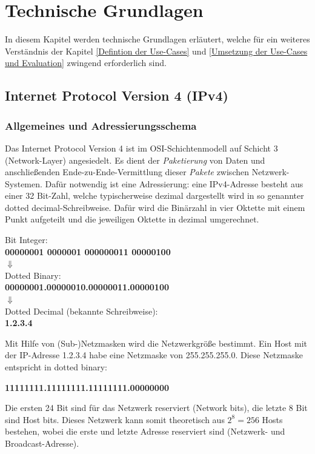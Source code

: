 \chapter{Technische Grundlagen} \label{Technische_Grundlagen}
In diesem Kapitel werden technische Grundlagen erläutert, welche für ein weiteres Verständnis der Kapitel \ref{Defintion der Use-Cases} und \ref{Umsetzung der Use-Cases und Evaluation} zwingend erforderlich sind.
\section{Internet Protocol Version 4 (IPv4)} \label{ipv4}
\subsection{Allgemeines und Adressierungsschema}
Das Internet Protocol Version 4 ist im \gls{OSI-Schichtenmodell} auf Schicht 3 (Network-Layer) angesiedelt\cite{itu1994}. Es dient der \textit{Paketierung} von Daten und anschließenden Ende-zu-Ende-Vermittlung dieser \textit{Pakete} zwischen Netzwerk-Systemen. Dafür notwendig ist eine Adressierung: eine IPv4-Adresse besteht aus einer 32 Bit-Zahl, welche typischerweise dezimal dargestellt wird in so genannter \glqq dotted decimal\grqq{}-Schreibweise. Dafür wird die Binärzahl in vier Oktette mit einem Punkt aufgeteilt und die jeweiligen Oktette in dezimal umgerechnet.

{ Bit Integer:\\
\textbf{00000001 0000001 000000011 00000100}\\
$\Downarrow$\\
\glqq Dotted Binary\grqq{}:\\
\textbf{00000001.00000010.00000011.00000100}\\
$\Downarrow$\\
Dotted Decimal (bekannte Schreibweise):\\
{\textbf{1.2.3.4}}\par}

Mit Hilfe von (Sub-)Netzmasken wird die Netzwerkgröße bestimmt. Ein Host mit der IP-Adresse 1.2.3.4 habe eine Netzmaske von 255.255.255.0. Diese Netzmaske entspricht in dotted binary:

{\centering\textbf{11111111.11111111.11111111.00000000}\par}

Die ersten 24 Bit sind für das Netzwerk reserviert (Network bits), die letzte 8 Bit sind Host bits. Dieses Netzwerk kann somit theoretisch aus $2^8 = 256$ Hosts bestehen, wobei die erste und letzte Adresse reserviert sind (Netzwerk- und Broadcast-Adresse).

